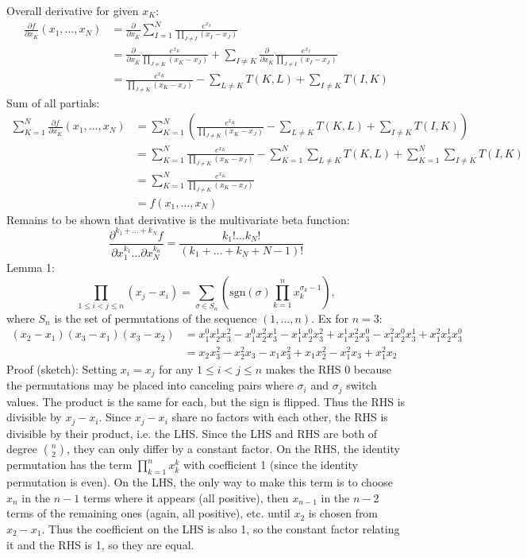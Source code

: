 \documentclass{article}
\begin{document}
Overall derivative for given $x_K$:
\begin{align*}
  \frac{\partial f}{\partial x_K}(x_1, \ldots, x_N)
  &= \frac{\partial}{\partial x_K} \sum_{I=1}^N \frac{e^{x_I}}{\prod\limits_{J \neq I}(x_I-x_J)} \\
  &= \frac{\partial}{\partial x_K} \frac{e^{x_K}}{\prod\limits_{J \neq K}(x_K-x_J)} + \sum_{I \neq K} \frac{\partial}{\partial x_K} \frac{e^{x_I}}{\prod\limits_{J \neq I}(x_I-x_J)} \\
  &= \frac{e^{x_K}}{\prod\limits_{J \neq K}(x_K-x_J)}-\sum\limits_{L \neq K}T(K, L)+\sum_{I \neq K}T(I, K)
\end{align*}
Sum of all partials:
\begin{align*}
  \sum_{K=1}^N\frac{\partial f}{\partial x_K}(x_1, \ldots, x_N)
  &= \sum_{K=1}^N\left(\frac{e^{x_K}}{\prod\limits_{J \neq K}(x_K-x_J)}-\sum\limits_{L \neq K}T(K, L)+\sum_{I \neq K}T(I, K)\right) \\
  &= \sum_{K=1}^N\frac{e^{x_K}}{\prod\limits_{J \neq K}(x_K-x_J)}-\sum_{K=1}^N\sum\limits_{L \neq K}T(K, L)+\sum_{K=1}^N\sum_{I \neq K}T(I, K) \\
  &= \sum_{K=1}^N\frac{e^{x_K}}{\prod\limits_{J \neq K}(x_K-x_J)} \\
  &= f(x_1, \ldots, x_N)
\end{align*}
Remains to be shown that derivative is the multivariate beta function:
\[\frac{\partial^{k_1+\ldots+k_N}f}{\partial x_1^{k_1}\ldots\partial x_N^{k_n}}
= \frac{k_1! \ldots k_N!}{(k_1+\ldots+k_N+N-1)!}\]
\newpage
Lemma 1:
\[\prod_{1 \leq i < j \leq n} (x_j-x_i) = \sum_{\sigma \in S_n}\left(\text{sgn}(\sigma)\prod_{k=1}^nx_k^{\sigma_k-1}\right),\]
where $S_n$ is the set of permutations of the sequence $(1, \ldots, n)$.
Ex for $n=3$:
\begin{align*}
  (x_2-x_1)(x_3-x_1)(x_3-x_2)
  &= x_1^0x_2^1x_3^2-x_1^0x_2^2x_3^1-x_1^1x_2^0x_3^2+x_1^1x_2^2x_3^0-x_1^2x_2^0x_3^1+x_1^2x_2^1x_3^0 \\
  &= x_2x_3^2-x_2^2x_3-x_1x_3^2+x_1x_2^2-x_1^2x_3+x_1^2x_2
\end{align*}
Proof (sketch): Setting $x_i=x_j$ for any $1 \leq i < j \leq n$ makes the RHS 0
because the permutations may be placed into canceling pairs
where $\sigma_i$ and $\sigma_j$ switch values.
The product is the same for each, but the sign is flipped.
Thus the RHS is divisible by $x_j-x_i$.
Since $x_j-x_i$ share no factors with each other,
the RHS is divisible by their product, i.e. the LHS.
Since the LHS and RHS are both of degree $\binom{n}{2}$,
they can only differ by a constant factor.
On the RHS, the identity permutation has the term $\prod\limits_{k=1}^nx_k^k$
with coefficient 1 (since the identity permutation is even).
On the LHS, the only way to make this term
is to choose $x_n$ in the $n-1$ terms where it appears (all positive),
then $x_{n-1}$ in the $n-2$ terms of the remaining ones (again, all positive),
etc. until $x_2$ is chosen from $x_2-x_1$.
Thus the coefficient on the LHS is also 1,
so the constant factor relating it and the RHS is 1,
so they are equal.
\end{document}
